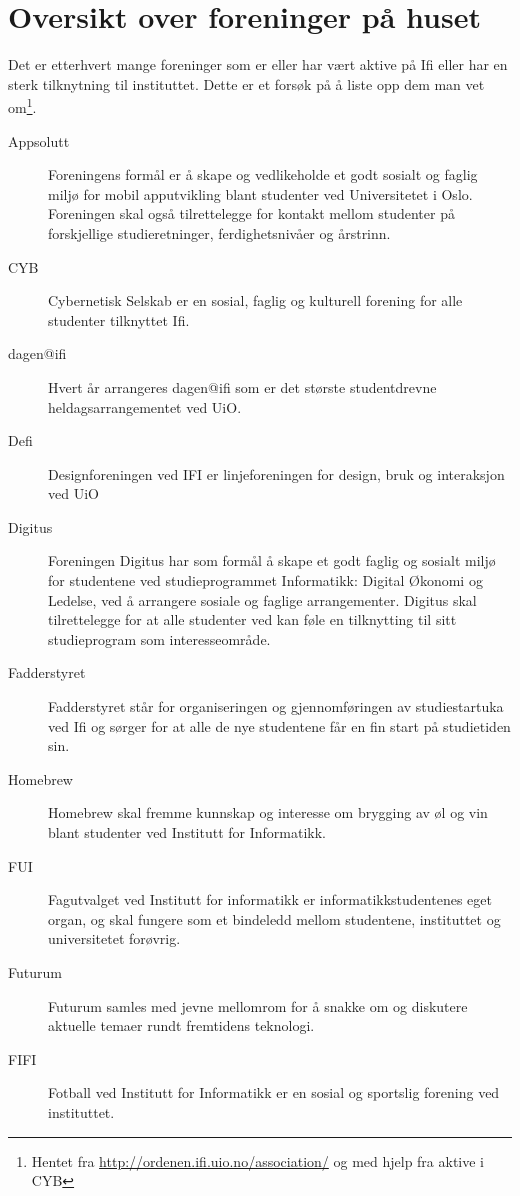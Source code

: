 \chapter{Oversikt over foreninger på huset}

Det er etterhvert mange foreninger som er eller har vært aktive på Ifi eller har en sterk tilknytning til instituttet. Dette er et forsøk på å liste opp dem man vet om\footnote{Hentet fra \url{http://ordenen.ifi.uio.no/association/} og med hjelp fra aktive i CYB}.

\begin{description}
	\item[Appsolutt] Foreningens formål er å skape og vedlikeholde et godt sosialt og faglig miljø for mobil apputvikling blant studenter ved Universitetet i Oslo. Foreningen skal også tilrettelegge for kontakt mellom studenter på forskjellige studieretninger, ferdighetsnivåer og årstrinn.
	\item[CYB] Cybernetisk Selskab er en sosial, faglig og kulturell forening for alle studenter tilknyttet Ifi.
	\item[dagen@ifi] Hvert år arrangeres dagen@ifi som er det største studentdrevne heldagsarrangementet ved UiO.
	\item[Defi] Designforeningen ved IFI er linjeforeningen for design, bruk og interaksjon ved UiO
	\item[Digitus] Foreningen Digitus har som formål å skape et godt faglig og sosialt miljø for studentene ved studieprogrammet Informatikk: Digital Økonomi og Ledelse, ved å arrangere sosiale og faglige arrangementer. Digitus skal tilrettelegge for at alle studenter ved kan føle en tilknytting til sitt studieprogram som interesseområde.
	\item[Fadderstyret] Fadderstyret står for organiseringen og gjennomføringen av studiestartuka ved Ifi og sørger for at alle de nye studentene får en fin start på studietiden sin.
	\item[Homebrew] Homebrew skal fremme kunnskap og interesse om brygging av øl og vin blant studenter ved Institutt for Informatikk.
	\item[FUI] Fagutvalget ved Institutt for informatikk er informatikkstudentenes eget organ, og skal fungere som et bindeledd mellom studentene, instituttet og universitetet forøvrig.
	\item[Futurum] Futurum samles med jevne mellomrom for å snakke om og diskutere aktuelle temaer rundt fremtidens teknologi.
	\item[FIFI] Fotball ved Institutt for Informatikk er en sosial og sportslig forening ved instituttet.

\end{description}
